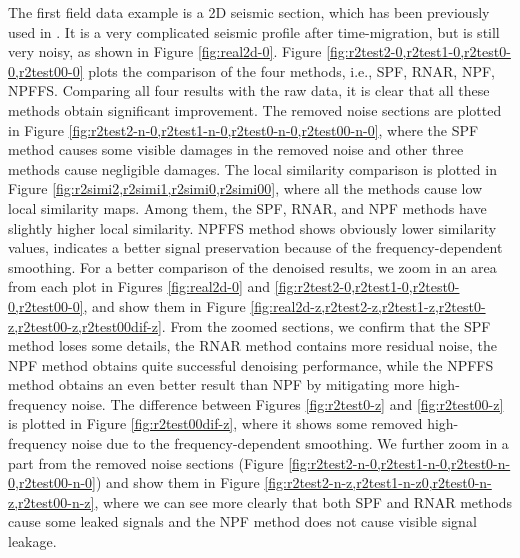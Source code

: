 The first field data example is a 2D seismic section, which has been previously used in \cite{guochang2012}. It is a very complicated seismic profile after time-migration, but is still very noisy, as shown in Figure \ref{fig:real2d-0}. Figure \ref{fig:r2test2-0,r2test1-0,r2test0-0,r2test00-0} plots the comparison of the four methods, i.e., SPF, RNAR, NPF, NPFFS. Comparing all four results with the raw data, it is clear that all these methods obtain significant improvement. The removed noise sections are plotted in Figure \ref{fig:r2test2-n-0,r2test1-n-0,r2test0-n-0,r2test00-n-0}, where the SPF method causes some visible damages in the removed noise and other three methods cause negligible damages. The local similarity comparison is plotted in Figure \ref{fig:r2simi2,r2simi1,r2simi0,r2simi00}, where all the methods cause low local similarity maps. Among them, the SPF, RNAR, and NPF methods have slightly higher local similarity. NPFFS method shows obviously lower similarity values, indicates a better signal preservation because of the frequency-dependent smoothing. For a better comparison of the denoised results, we zoom in an area from each plot in Figures \ref{fig:real2d-0} and \ref{fig:r2test2-0,r2test1-0,r2test0-0,r2test00-0}, and show them in Figure \ref{fig:real2d-z,r2test2-z,r2test1-z,r2test0-z,r2test00-z,r2test00dif-z}. From the zoomed sections, we confirm that the SPF method loses some details, the RNAR method contains more residual noise, the NPF method obtains quite successful denoising performance, while the NPFFS method obtains an even better result than NPF by mitigating more high-frequency noise. The difference between Figures \ref{fig:r2test0-z} and \ref{fig:r2test00-z} is plotted in Figure \ref{fig:r2test00dif-z}, where it shows some removed high-frequency noise due to the frequency-dependent smoothing. We further zoom in a part from the removed noise sections (Figure \ref{fig:r2test2-n-0,r2test1-n-0,r2test0-n-0,r2test00-n-0}) and show them in Figure \ref{fig:r2test2-n-z,r2test1-n-z0,r2test0-n-z,r2test00-n-z}, where we can see more clearly that both SPF and RNAR methods cause some leaked signals and the NPF method does not cause visible signal leakage. 

